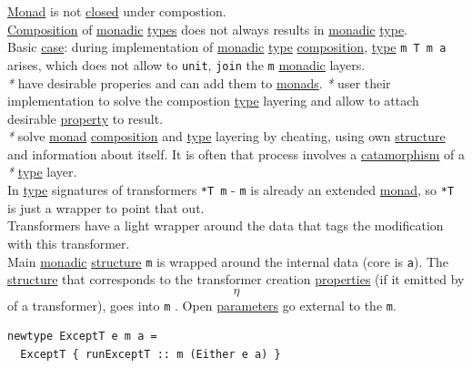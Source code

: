 \documentclass[11pt]{article}
\begin{document}
\begin{enumerate}
\hyperref[org86a5d95]{Monad} is not \hyperref[orgcdd7006]{closed} under compostion.\\
\hyperref[orga128e7f]{Composition} of \hyperref[orgad51197]{monadic} \hyperref[org4209edd]{types} does not always results in \hyperref[orgad51197]{monadic} \hyperref[orgc4aea2f]{type}.\\

Basic \hyperref[org41d12b6]{case}: during implementation of \hyperref[orgad51197]{monadic} \hyperref[orgc4aea2f]{type} \hyperref[orga128e7f]{composition}, \hyperref[orgc4aea2f]{type} \texttt{m T m a} arises, which does not allow to \texttt{unit}, \texttt{join} the \texttt{m} \hyperref[orgad51197]{monadic} layers.\\

\emph{*} have desirable properies and can add them to \hyperref[org0d4a4ef]{monads}. \emph{*} user their implementation to solve the compostion \hyperref[orgc4aea2f]{type} layering and allow to attach desirable \hyperref[orgf8c3cc7]{property} to result.\\

\emph{*} solve \hyperref[org86a5d95]{monad} \hyperref[orga128e7f]{composition} and \hyperref[orgc4aea2f]{type} layering by cheating, using own \hyperref[org8051f61]{structure} and information about itself. It is often that process involves a \hyperref[orgefe2953]{catamorphism} of a \emph{*} \hyperref[orgc4aea2f]{type} layer.\\

In \hyperref[orgc4aea2f]{type} signatures of transformers \texttt{*T m} - \texttt{m} is already an extended \hyperref[org86a5d95]{monad}, so \texttt{*T} is just a wrapper to point that out.\\

Transformers have a light wrapper around the data that tags the modification with this transformer.\\

Main \hyperref[orgad51197]{monadic} \hyperref[org8051f61]{structure} \texttt{m} is wrapped around the internal data (core is \texttt{a}). The \hyperref[org8051f61]{structure} that corresponds to the transformer creation \hyperref[org85fb3a1]{properties} (if it emitted by $$ \eta $$ of a transformer), goes into \texttt{m} . Open \hyperref[orgcafb058]{parameters} go external to the \texttt{m}.\\

\begin{verbatim}
newtype ExceptT e m a =
  ExceptT { runExceptT :: m (Either e a) }


\end{verbatim}
\end{enumerate}
\end{document}
